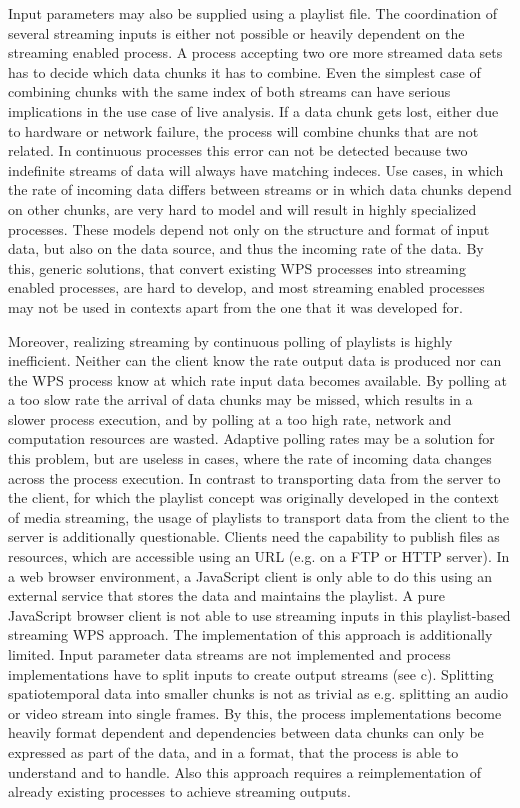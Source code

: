 	Input parameters may also be supplied using a playlist file. The coordination of several streaming inputs is either not possible or heavily dependent on the streaming enabled process. A process accepting two ore more streamed data sets has to decide which data chunks it has to combine. Even the simplest case of combining chunks with the same index of both streams can have serious implications in the use case of live analysis. If a data chunk gets lost, either due to hardware or network failure, the process will combine chunks that are not related. In continuous processes this error can not be detected because two indefinite streams of data will always have matching indeces. Use cases, in which the rate of incoming data differs between streams or in which data chunks depend on other chunks, are very hard to model and will result in highly specialized processes. These models depend not only on the structure and format of input data, but also on the data source, and thus the incoming rate of the data. By this, generic solutions, that convert existing \ac{WPS} processes into streaming enabled processes, are hard to develop, and most streaming enabled processes may not be used in contexts apart from the one that it was developed for.

	Moreover, realizing streaming by continuous polling of playlists is highly inefficient. Neither can the client know the rate output data is produced nor can the \ac{WPS} process know at which rate input data becomes available. By polling at a too slow rate the arrival of data chunks may be missed, which results in a slower process execution, and by polling at a too high rate, network and computation resources are wasted. Adaptive polling rates may be a solution for this problem, but are useless in cases, where the rate of incoming data changes across the process execution. In contrast to transporting data from the server to the client, for which the playlist concept was originally developed in the context of media streaming, the usage of playlists to transport data from the client to the server is additionally questionable. Clients need the capability to publish files as resources, which are accessible using an URL (e.g. on a FTP or HTTP server). In a web browser environment, a JavaScript client is only able to do this using an external service that stores the data and maintains the playlist. A pure JavaScript browser client is not able to use streaming inputs in this playlist-based streaming \ac{WPS} approach. The implementation of this approach is additionally limited. Input parameter data streams are not implemented and process implementations have to split inputs to create output streams (see c). Splitting spatiotemporal data into smaller chunks is not as trivial as e.g. splitting an audio or video stream into single frames. By this, the process implementations become heavily format dependent and dependencies between data chunks can only be expressed as part of the data, and in a format, that the process is able to understand and to handle. Also this approach requires a reimplementation of already existing processes to achieve streaming outputs.

